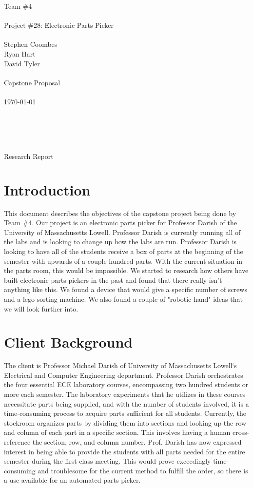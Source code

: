 \documentclass[12pt]{report}
\begin{document}
\noindent Team \#4 \\  \\
Project \#28: Electronic Parts Picker \\ \\
Stephen Coombes \\
Ryan Hart \\
David Tyler \\ \\
Capstone Proposal \\ \\
\today \\ \\ \\ \\ \\
\centerline{Research Report}
\newpage

\section*{Introduction}

This document describes the objectives of the capstone project being done by Team \#4. Our project is an electronic parts picker for Professor Darish of the University of Massachusetts Lowell. Professor Darish is currently running all of the labs and is looking to change up how the labs are run. Professor Darish is looking to have all of the students receive a box of parts at the beginning of the semester with upwards of a couple hundred parts. With the current situation in the parts room, this would be impossible. We started to research how others have built electronic parts pickers in the past and found that there really isn't anything like this. We found a device that would give a specific number of screws and a lego sorting machine. We also found a couple of "robotic hand" ideas that we will look further into. 


\section*{Client Background}

The client is Professor Michael Darish of University of Massachusetts Lowell`s Electrical and Computer Engineering department.  Professor Darish orchestrates the four essential ECE laboratory courses, encompassing two hundred students or more each semester.  The laboratory experiments that he utilizes in these courses necessitate parts being supplied, and with the number of students involved, it is a time-consuming process to acquire parts sufficient for all students.  Currently, the stockroom organizes parts by dividing them into sections and looking up the row and column of each part in a specific section. This involves having a human cross-reference the section, row, and column number. Prof. Darish has now expressed interest in being able to provide the students with all parts needed for the entire semester during the first class meeting.  This would prove exceedingly time-consuming and troublesome for the current method to fulfill the order, so there is a use available for an automated parts picker.  
\end{document}
